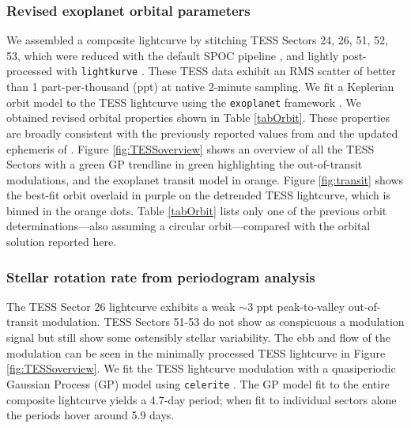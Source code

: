\documentclass[twocolumn]{aastex631}
\begin{document}
\subsubsection{Revised exoplanet orbital parameters}
We assembled a composite lightcurve by stitching TESS Sectors 24, 26, 51, 52, 53, which were reduced with the default SPOC pipeline \citep{2020RNAAS...4..201C}, and lightly post-processed with \texttt{lightkurve} \citep{geert_barentsen_2019_2565212}.  These TESS data exhibit an RMS scatter of better than 1 part-per-thousand (ppt) at native 2-minute sampling.  We fit a Keplerian orbit model to the TESS lightcurve using the \texttt{exoplanet} framework \citep{exoplanet:joss}.  We obtained revised orbital properties shown in Table \ref{tabOrbit}.  These properties are broadly consistent with the previously reported values from \citet{2017AJ....153..211Z} and the updated ephemeris of \citet{2022ApJS..259...62I}.  Figure \ref{fig:TESSoverview} shows an overview of all the TESS Sectors with a green GP trendline in green highlighting the out-of-transit modulations, and the exoplanet transit model in orange.  Figure \ref{fig:transit} shows the best-fit orbit overlaid in purple on the detrended TESS lightcurve, which is binned in the orange dots.  Table \ref{tabOrbit} lists only one of the previous orbit determinations---also assuming a circular orbit---compared with the orbital solution reported here.

\subsubsection{Stellar rotation rate from periodogram analysis}\label{TESSmodulation}

The TESS Sector 26 lightcurve exhibits a weak $\sim$3 ppt peak-to-valley out-of-transit modulation. TESS Sectors 51-53 do not show as conspicuous a modulation signal but still show some ostensibly stellar variability.  The ebb and flow of the modulation can be seen in the minimally processed TESS lightcurve in Figure \ref{fig:TESSoverview}.  We fit the TESS lightcurve modulation with a quasiperiodic Gaussian Process (GP) model using \texttt{celerite} \citep{celerite1,celerite2}.  The GP model fit to the entire composite lightcurve yields a 4.7-day period; when fit to individual sectors alone the periods hover around 5.9 days.
\end{document}
